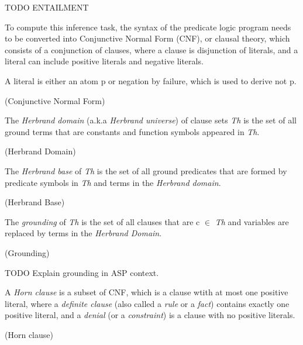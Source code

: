 \documentclass[12pt,twoside]{report}
\begin{document}
TODO ENTAILMENT

To compute this inference task, the syntax of the predicate logic program needs to be converted into Conjunctive Normal Form (CNF), or clausal theory, which consists of a conjunction of clauses, where a clause is disjunction of literals, and a literal can include positive literals and negative literals.

A literal is either an atom p or negation by failure, which is used to derive not p.

\begin{examp} (Conjunctive Normal Form)

\end{examp}


The \textit{Herbrand domain} (a.k.a \textit{Herbrand universe}) of clause sets \textit{Th} is the set of all ground terms that are constants and function symbols appeared in \textit{Th}.

\begin{examp} (Herbrand Domain)

\end{examp}

The \textit{Herbrand base} of \textit{Th} is the set of all ground predicates that are formed by predicate symbols in \textit{Th} and terms in the \textit{Herbrand domain}.

\begin{examp} (Herbrand Base)

\end{examp}

The \textit{grounding} of \textit{Th} is the set of all clauses that are c $\in$ \textit{Th} and variables are replaced by terms in the \textit{Herbrand Domain}.

\begin{examp} (Grounding)

\end{examp}


TODO Explain grounding in ASP context.


A \textit{Horn clause} is a subset of CNF, which is a clause wtith at most one positive literal, where a \textit{definite clause} (also called a \textit{rule} or a \textit{fact}) contains exactly one positive literal, and a \textit{denial} (or a \textit{constraint}) is a clause with no positive literals.

\begin{examp} (Horn clause)

\end{examp}
\end{document}
